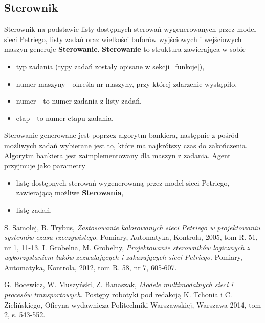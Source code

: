 \documentclass[10pt, a4paper]{article}
\begin{document}
\subsection{Sterownik}
Sterownik na podstawie listy dostępnych sterowań wygenerowanych przez model sieci Petriego, listy zadań oraz wielkości buforów wyjściowych i wejściowych maszyn generuje \textbf{Sterowanie}. \textbf{Sterowanie} to struktura zawierająca w sobie
\begin{itemize}
\item typ zadania (typy zadań zostały opisane w sekcji~\ref{funkcje}),
\item numer maszyny - określa nr maszyny, przy której zdarzenie wystąpiło,
\item numer - to numer zadania z listy zadań,
\item etap - to numer etapu zadania.
\end{itemize}
Sterowanie generowane jest poprzez algorytm bankiera, następnie z pośród możliwych zadań wybierane jest to, które ma najkrótszy czas do zakończenia. Algorytm bankiera jest zaimplementowany dla maszyn z zadania.  Agent przyjmuje jako parametry
\begin{itemize}
\item listę dostępnych sterowań wygenerowaną przez model sieci Petriego, zawierającą możliwe \textbf{Sterowania},
\item listę zadań.
\end{itemize}

\begin{thebibliography}{9}
  S. Samolej, B. Trybus,
  \emph{Zastosowanie kolorowanych sieci Petriego w projektowaniu systemów czasu rzeczywistego}.
  Pomiary, Automatyka, Kontrola,
  2005,
  tom R. 51, nr 1,
  11-13.
  I. Grobelna, M. Grobelny,
  \emph{Projektowanie sterowników logicznych z wykorzystaniem łuków zezwalających i zakazujących sieci Petriego}.	
  Pomiary, Automatyka, Kontrola,
  2012,
  tom R. 58, nr 7,
  605-607.
  
  G. Bocewicz, W. Muszyński, Z. Banaszak,
  \emph{Modele multimodalnych sieci i procesów transportowych}.
  Postępy robotyki pod redakcją K. Tchonia i C. Zielińskiego,
  Oficyna wydawnicza Politechniki Warszawskiej,
   Warszawa 2014,
   tom 2, s. 543-552.

\end{thebibliography}
\end{document}
